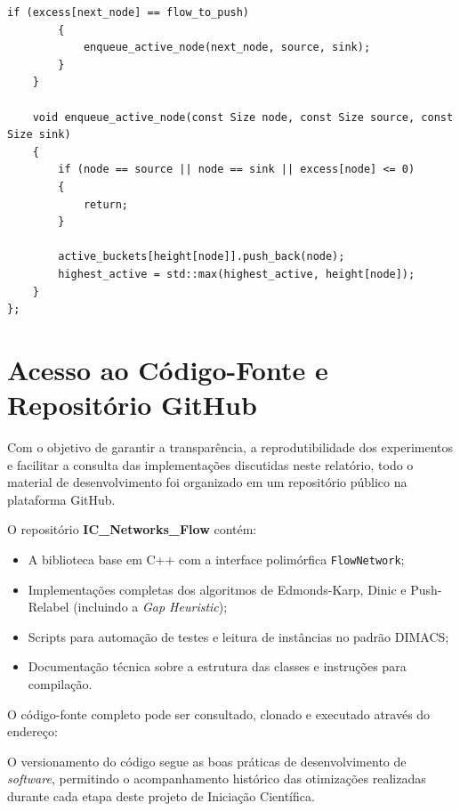 \documentclass[12pt,a4paper]{article}
\begin{document}
\begin{lstlisting}[caption={Implementação em C++ da classe \lstinline{PushRelabelImproved}, otimizada empiricamente com a Heurística de Lacuna (\textit{Gap Heuristic}).}, label={lst:push_relabel_improved}]
		if (excess[next_node] == flow_to_push)
		{
			enqueue_active_node(next_node, source, sink);
		}
	}

	void enqueue_active_node(const Size node, const Size source, const Size sink)
	{
		if (node == source || node == sink || excess[node] <= 0)
		{
			return;
		}

		active_buckets[height[node]].push_back(node);
		highest_active = std::max(highest_active, height[node]);
	}
};
\end{lstlisting}

\newpage
\section{Acesso ao Código-Fonte e Repositório GitHub}
\label{ap:github}

Com o objetivo de garantir a transparência, a reprodutibilidade dos experimentos e facilitar a consulta das implementações discutidas neste relatório, todo o material de desenvolvimento foi organizado em um repositório público na plataforma GitHub.

O repositório \textbf{IC\_Networks\_Flow} contém:
\begin{itemize}
    \item A biblioteca base em C++ com a interface polimórfica \lstinline{FlowNetwork};
    \item Implementações completas dos algoritmos de Edmonds-Karp, Dinic e Push-Relabel (incluindo a \textit{Gap Heuristic});
    \item Scripts para automação de testes e leitura de instâncias no padrão DIMACS;
    \item Documentação técnica sobre a estrutura das classes e instruções para compilação.
\end{itemize}

O código-fonte completo pode ser consultado, clonado e executado através do endereço:

\vspace{0.4cm}
\begin{center}
\end{center}
\vspace{0.4cm}

O versionamento do código segue as boas práticas de desenvolvimento de \textit{software}, permitindo o acompanhamento histórico das otimizações realizadas durante cada etapa deste projeto de Iniciação Científica.
\end{document}
